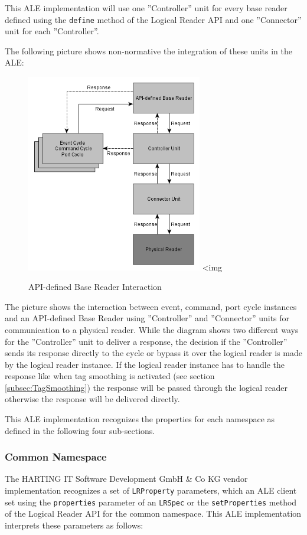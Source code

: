 \documentclass[11pt,a4paper,oneside]{article}
\newenvironment{img}
{\ifvmode\IgnorePar\fi \EndP\HCode<img}{\HCode{/>}\IgnoreIndent}
\begin{document}
This ALE implementation will use one ''Controller'' unit for every base reader defined using the \texttt{define} method of the Logical Reader API and one ''Connector'' unit for each ''Controller''.
 
\newpage

The following picture shows non-normative the integration of these units in the ALE:

\begin{figure}[!h]
\center 
\ifpdf
\includegraphics[width=290px]{img/Reader.png}
\else
\begin{img}

\end{img}
\fi
\caption{API-defined Base Reader Interaction}
\MakeLineNo
\end{figure}
\FloatBarrier

The picture shows the interaction between event, command, port cycle instances and an API-defined Base Reader using ''Controller'' and ''Connector'' units for communication to a physical reader. While the diagram shows two different ways for the ''Controller'' unit to deliver a response, the decision if the ''Controller'' sends its response directly to the cycle or bypass it over the logical reader is made by the logical reader instance. If the logical reader instance has to handle the response like when tag smoothing is activated (see section \ref{subsec:TagSmoothing}) the response will be passed through the logical reader otherwise the response will be delivered directly.

This ALE implementation recognizes the properties for each namespace as defined in the following four sub-sections.

\subsubsection{Common Namespace}
The HARTING IT Software Development GmbH \& Co KG vendor implementation recognizes a set of \texttt{LRProperty} parameters, which an ALE client set using the \texttt{properties} parameter of an \texttt{LRSpec} or the \texttt{setProperties} method of the Logical Reader API for the common namespace. This ALE implementation interprets these parameters as follows:
\end{document}
